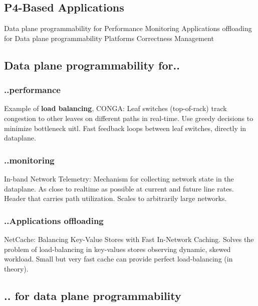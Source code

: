 \documentclass[a4paper, fontsize=8pt, landscape, DIV=1]{scrartcl}
\begin{document}
\begin{multicols*}{4}
  \section{P4-Based Applications}
  \begin{outline}
  \1 Data plane programmability for
    \2 Performance
    \2 Monitoring
    \2 Applications offloading
  \1 for Data plane programmability
    \2 Platforms
    \2 Correctness
    \2 Management
  \end{outline}

  \subsection{Data plane programmability for..}

  \subsubsection{..performance}
  Example of \textbf{load balancing}, CONGA: Leaf switches (top-of-rack) track congestion to other leaves on different
  paths in real-time. Use greedy decisions to minimize bottleneck uitl. Fast feedback
  loops between leaf switches, directly in dataplane.

  \subsubsection{..monitoring}
  In-band Network Telemetry: Mechanism for collecting network state in the dataplane.
  As close to realtime as possible at current and future line rates. Header that carries
  path utilization. Scales to arbitrarily large networks.

  \subsubsection{..Applications offloading}
  NetCache: Balancing Key-Value Stores with Fast In-Network Caching. Solves the problem of
  load-balancing in key-values stores observing dynamic, skewed workload. Small but
  very fast cache can provide perfect load-balancing (in theory).

  \subsection{.. for data plane programmability}


\end{multicols*}
\end{document}
